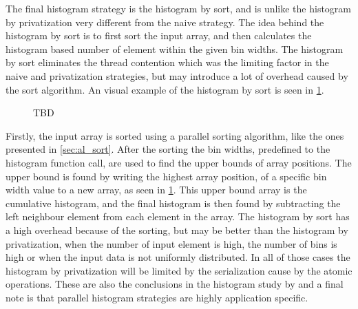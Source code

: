 The final histogram strategy is the histogram by sort, and is unlike the histogram by privatization very different from the naive strategy. The idea behind the histogram by sort is to first sort the input array, and then calculates the histogram based number of element within the given bin widths. The histogram by sort eliminates the thread contention which was the limiting factor in the naive and privatization strategies, but may introduce a lot of overhead caused by the sort algorithm. An visual example of the histogram by sort is seen in \cref{fig:hist_sort}. 

\begin{figure}[ht]
	\centering
	\caption{TBD}
	\label{fig:hist_sort}
\end{figure} 

Firstly, the input array is sorted using a parallel sorting algorithm, like the ones presented in \cref{sec:al_sort}. After the sorting the bin widths, predefined to the histogram function call, are used to find the upper bounds of array positions. The upper bound is found by writing the highest array position, of a specific bin width value to a new array, as seen in \cref{fig:hist_sort}. This upper bound array is the cumulative histogram, and the final histogram is then found by subtracting the left neighbour element from each element in the array. 
The histogram by sort has a high overhead because of the sorting, but may be better than the histogram by privatization, when the number of input element is high, the number of bins is high or when the input data is not uniformly distributed. In all of those cases the histogram by privatization will be limited by the serialization cause by the atomic operations. These are also the conclusions in the histogram study by \cite{MilicHistogram} and a final note is that parallel histogram strategies are highly application specific.